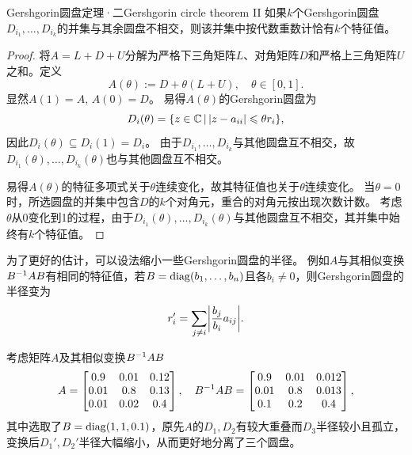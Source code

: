 \begin{theorem}
    {Gershgorin圆盘定理·二}{Gershgorin circle theorem II}
    如果$k$个Gershgorin圆盘$D_{i_1},\ldots,D_{i_k}$的并集与其余圆盘不相交，则该并集中按代数重数计恰有$k$个特征值。
\end{theorem}

\begin{proof}
    将$A = L + D + U$分解为严格下三角矩阵$L$、对角矩阵$D$和严格上三角矩阵$U$之和。定义
    \[
        A(\theta) := D + \theta(L + U),\quad\theta \in [0,1].
    \]
    显然$A(1) = A,\,A(0) = D$。
    易得$A(\theta)$的Gershgorin圆盘为
    \[
        D_i(\theta) = \{z \in \mathbb{C}\,\vert\,\lvert z - a_{ii}\rvert \leqslant \theta r_i\},
    \]
    因此$D_i(\theta) \subseteq D_i(1) = D_i$。
    由于$D_{i_1},\ldots,D_{i_k}$与其他圆盘互不相交，故$D_{i_1}(\theta),\ldots,D_{i_k}(\theta)$也与其他圆盘互不相交。

    易得$A(\theta)$的特征多项式关于$\theta$连续变化，故其特征值也关于$\theta$连续变化。
    当$\theta = 0$时，所选圆盘的并集中包含$D$的$k$个对角元，重合的对角元按出现次数计数。
    考虑$\theta$从0变化到1的过程，由于$D_{i_1}(\theta),\ldots,D_{i_k}(\theta)$与其他圆盘互不相交，其并集中始终有$k$个特征值。
\end{proof}

\begin{notecaptionblock}
    \label{fig:Gershgorin circle theorem}
\end{notecaptionblock}

\begin{corollary}
    为了更好的估计，可以设法缩小一些Gershgorin圆盘的半径。
    例如$A$与其相似变换$B^{-1} AB$有相同的特征值，若$B = \operatorname{diag}(b_1,\ldots,b_n)$且各$b_i \neq 0$，则Gershgorin圆盘的半径变为
    \begin{equation}\label{eq:na-scaled-gershgorin-radii}
        r_i' = \sum_{j\neq i}\biggl\lvert\frac{b_j}{b_i}a_{ij}\biggr\rvert.
    \end{equation}
\end{corollary}

\begin{example}
    {}{}
    考虑矩阵$A$及其相似变换$B^{-1} AB$
    \[
        A = \begin{bmatrix}
            0.9&0.01&0.12\\
            0.01&0.8&0.13\\
            0.01&0.02&0.4
        \end{bmatrix},\quad
        B^{-1} AB = \begin{bmatrix}
            0.9&0.01&0.012\\
            0.01&0.8&0.013\\
            0.1&0.2&0.4
        \end{bmatrix},
    \]
    其中选取了$B = \operatorname{diag}(1,1,0.1)$，原先$A$的$D_1,D_2$有较大重叠而$D_3$半径较小且孤立，变换后$D_1',D_2'$半径大幅缩小，从而更好地分离了三个圆盘。
\end{example}


